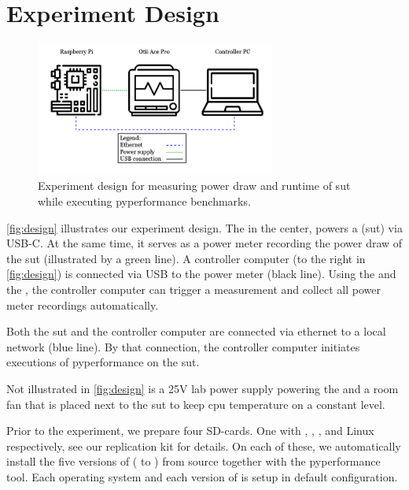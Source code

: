 \section{Experiment Design}\label{sec:experimentdesign}

\begin{figure}
    \centering
    \includegraphics[width=0.7\textwidth]{../images/experiment.png}
    \caption{Experiment design for measuring power draw and runtime of \gls{sut} while executing \gls{pyperformance} benchmarks.}
    \label{fig:design}
\end{figure}

\autoref{fig:design} illustrates our experiment design.
The  in the center, powers a  (\gls{sut}) via USB-C.
At the same time, it serves as a power meter recording the power draw of the \gls{sut} (illustrated by a green line).
A controller computer (to the right in \autoref{fig:design}) is connected via USB to the power meter (black line).
Using the 
and the 
, the controller computer can trigger a measurement and collect all power meter recordings automatically.

Both the \gls{sut} and the controller computer are connected via ethernet to a local network (blue line).
By that connection, the controller computer initiates executions of \acrlong{pyperformance} on the \gls{sut}.

Not illustrated in \autoref{fig:design} is a 25V lab power supply powering the  and a room fan that is placed next to the \gls{sut} to keep \gls{cpu} temperature on a constant level.

Prior to the experiment, we prepare four SD-cards.
One with , , , and  Linux respectively, see our replication kit for details.
On each of these, we automatically install the five versions of \python ( to ) from source together with the \gls{pyperformance} tool.
Each operating system and each version of \python is setup in default configuration.



